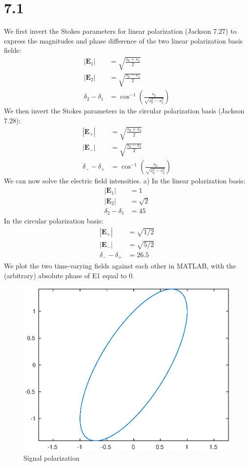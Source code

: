 \documentclass[a4paper,11pt]{article}
\numberwithin{equation}{section}
\newcommand{\bv}[1]{\mathbf{#1}}
\newcommand{\lrp}[1]{\left({#1}\right)}
\begin{document}
\section*{7.1}
We first invert the Stokes parameters for linear polarization (Jackson 7.27) to express the magnitudes and phase difference of the two linear polarization basis fields:
\begin{align}
 |\bv{E}_1| &= \sqrt{\frac{s_0+s_1}{2}}\\
 |\bv{E}_2| &= \sqrt{\frac{s_0-s_1}{2}}\\
 \delta_2-\delta_1 &= \cos^{-1}{\lrp{\frac{s_2}{\sqrt{s_0^2-s_1^2}}}}
\end{align}
We then invert the Stokes parameters in the circular polarization basis (Jackson 7.28):
\begin{align}
 |\bv{E}_+| &= \sqrt{\frac{s_0+s_3}{2}}\\
 |\bv{E}_-| &= \sqrt{\frac{s_0-s_3}{2}}\\
 \delta_--\delta_+ &= \cos^{-1}{\lrp{\frac{s_2}{\sqrt{s_0^2-s_3^2}}}}
\end{align}
We can now solve the electric field intensities.
a) In the linear polarization basis:
\begin{align}
 |\bv{E}_1| &= 1\\
 |\bv{E}_2| &= \sqrt{2}\\
 \delta_2-\delta_1 &= 45
\end{align}
In the circular polarization basis:
\begin{align}
 |\bv{E}_+| &= \sqrt{1/2}\\
 |\bv{E}_-| &= \sqrt{5/2}\\
 \delta_--\delta_+ &= 26.5
\end{align}
We plot the two time-varying fields against each other in MATLAB, with the (arbitrary) absolute phase of E1 equal to 0.
\begin{figure}[p]
 \caption{Signal polarization}
 \centering
   \includegraphics[width=\textwidth]{p71a}
\end{figure}
\end{document}
